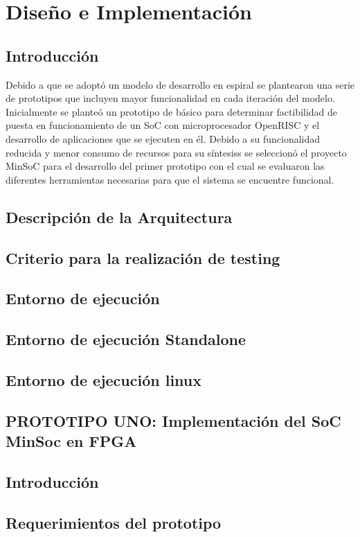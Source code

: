 \chapter{Diseño e Implementación}
	\section{Introducción}
	Debido a que se adoptó un modelo de desarrollo en espiral se plantearon una
	serie de prototipos que incluyen mayor funcionalidad en cada iteración del
	modelo. Inicialmente se planteó un prototipo de básico para determinar
	factibilidad de puesta en funcionamiento de un SoC con microprocesador
	OpenRISC y el desarrollo de aplicaciones que se ejecuten en él.
	Debido a su funcionalidad reducida y menor consumo de recursos para su
	síntesiss se seleccionó el proyecto MinSoC para el desarrollo del primer
	prototipo con el cual se evaluaron las diferentes herramientas
	necesarias para que el sistema se encuentre funcional.
	
	\section{Descripción de la Arquitectura}

	 
	\section{Criterio para la realización de testing}
	\section{Entorno de ejecución}
		\section{Entorno de ejecución Standalone}
		\section{Entorno de ejecución linux}
	
	\section{PROTOTIPO UNO: Implementación del SoC MinSoc en FPGA}
		\section{Introducción}
		\section{Requerimientos del prototipo}

